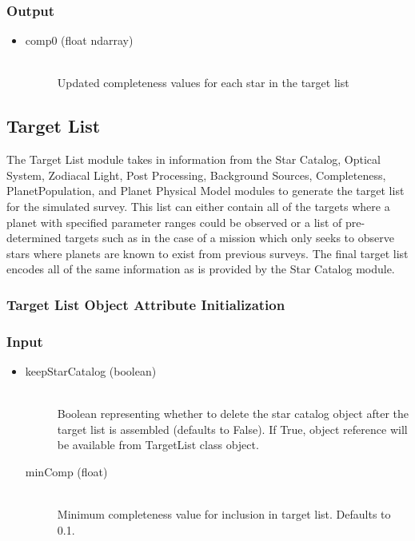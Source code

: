 \documentclass[cleanfoot]{asme2ej}
\begin{document}
\subsubsection*{Output}
\begin{itemize}
\item 
\begin{description}
    \item[comp0 (float ndarray)] \hfill \\
        Updated completeness values for each star in the target list
\end{description}
\end{itemize}



\subsection{Target List}
The Target List module takes in information from the Star Catalog, Optical System, Zodiacal Light, Post Processing, Background Sources, Completeness, PlanetPopulation, and Planet Physical Model modules to generate the target list for the simulated survey.  This list can either contain all of the targets where a planet with specified parameter ranges could be observed or a list of pre-determined targets such as in the case of a mission which only seeks to observe stars where planets are known to exist from previous surveys.  The final target list encodes all of the same information as is provided by the Star Catalog module.

\label{sec:targetlist}
\subsubsection{Target List Object Attribute Initialization}

\subsubsection*{Input}
\begin{itemize}
\item 
\begin{description}
    \item[keepStarCatalog (boolean)] \hfill \\ Boolean representing whether to delete the star catalog object after the target list is assembled (defaults to False).  If True, object reference will be available from TargetList class object.
    \item[minComp (float)] \hfill \\ Minimum completeness value for inclusion in target list.  Defaults to 0.1.
\end{description}
\end{itemize}
\end{document}
